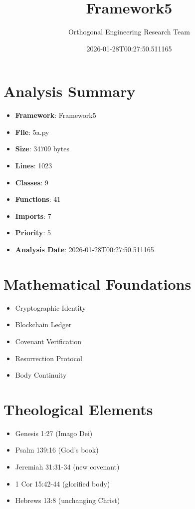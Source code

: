 \documentclass[12pt]{article}
\title{Framework5}
\author{Orthogonal Engineering Research Team}
\date{2026-01-28T00:27:50.511165}
\begin{document}
\maketitle

\section{Analysis Summary}

\begin{itemize}
    \item \textbf{Framework}: Framework5
    \item \textbf{File}: 5a.py
    \item \textbf{Size}: 34709 bytes
    \item \textbf{Lines}: 1023
    \item \textbf{Classes}: 9
    \item \textbf{Functions}: 41
    \item \textbf{Imports}: 7
    \item \textbf{Priority}: 5
    \item \textbf{Analysis Date}: 2026-01-28T00:27:50.511165
\end{itemize}

\section{Mathematical Foundations}

\begin{itemize}
    \item Cryptographic Identity
    \item Blockchain Ledger
    \item Covenant Verification
    \item Resurrection Protocol
    \item Body Continuity
\end{itemize}

\section{Theological Elements}

\begin{itemize}
    \item Genesis 1:27 (Imago Dei)
    \item Psalm 139:16 (God's book)
    \item Jeremiah 31:31-34 (new covenant)
    \item 1 Cor 15:42-44 (glorified body)
    \item Hebrews 13:8 (unchanging Christ)
\end{itemize}
\end{document}
